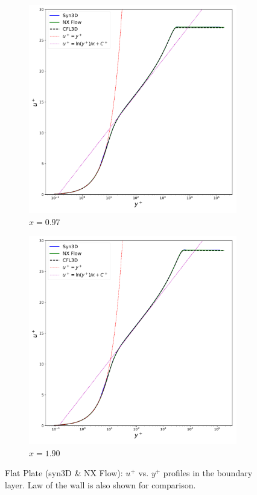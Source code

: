 \begin{figure}[ht!]
\centering
\begin{subfigure}{.45\textwidth}
  \centering
  \includegraphics[width=1.0\textwidth]{figs/flat/uplus_yplus_097.pdf}
  \caption{$x=0.97$}
\end{subfigure}%
\begin{subfigure}{.45\textwidth}
  \centering
  \includegraphics[width=1.0\textwidth]{figs/flat/uplus_yplus_190.pdf}
  \caption{$x=1.90$}
\end{subfigure}
\caption{Flat Plate (syn3D \& NX Flow): $u^+$ vs. $y^+$ profiles in the boundary layer. Law of the wall is also shown for comparison.}
\label{fig:flatupyp}
\end{figure}

